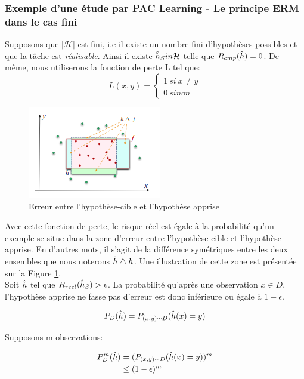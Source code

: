 \subsubsection{Exemple d'une étude par PAC Learning - Le principe ERM dans le cas fini}

\noindent Supposons que $|\mathcal{H}|$ est fini, i.e il existe un nombre fini d'hypothèses possibles et que la tâche est \textit{réalisable}. Ainsi il existe $\Hat{h}_S in \mathcal{H}$ telle que $R_{emp}(\Hat{h})=0$.  De même, nous utiliserons la fonction de perte L tel que:
$$L(x,y)=\left\{
\begin{array}{l}
  1 \ si \ x \neq y\\
  0 \ sinon
\end{array}
\right.$$

\begin{figure}
    \centering
    \includegraphics[scale=0.45]{./tex/induction/erm_c.png}
    \caption{Erreur entre l'hypothèse-cible et l'hypothèse apprise}
    \label{erm_c}
\end{figure}

\noindent Avec cette fonction de perte, le risque réel est égale à la probabilité qu'un exemple se situe dans la zone d'erreur entre l'hypothèse-cible et l'hypothèse apprise. En d'autres mots, il s'agit de la différence symétriques entre les deux ensembles que nous noterons $\Hat{h} \bigtriangleup h$. Une illustration de cette zone est présentée sur la Figure \ref{erm_c}.\\

\noindent Soit $\Hat{h}$ tel que $R_{reel}(\Hat{h}_S) > \epsilon$. La probabilité qu'après une observation $x \in D$, l'hypothèse apprise ne fasse pas d'erreur est donc inférieure ou égale à $1-\epsilon$.

$$P_D(\Hat{h}) = P_{(x,y) \sim D}(\Hat{h}(x)=y)$$

\noindent Supposons  m  observations:

\begin{align*}
P_D^m(\Hat{h}) &= (P_{(x,y) \sim D}(\Hat{h}(x)=y))^m\\
&\leq (1-\epsilon)^m\\
\end{align*}

